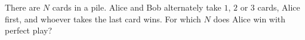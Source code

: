 There are $N$ cards in a pile. Alice and Bob alternately take $1$, $2$ or $3$ cards, Alice first, and whoever takes the last card wins. For which $N$ does Alice win with perfect play?
